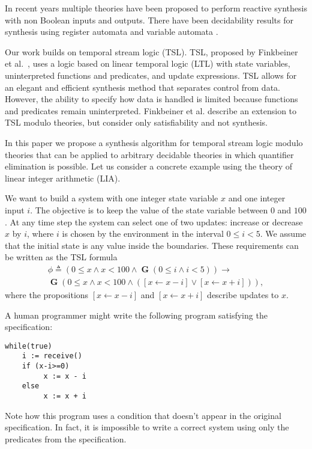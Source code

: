 \documentclass[runningheads]{llncs}
\newcommand{\globally}{\operatorname{\mathbf{G}}}
\newcommand{\rarrow}{\boldsymbol{\rightarrow}}
\begin{document}
In recent years multiple theories have been proposed to perform reactive synthesis with non Boolean inputs and outputs.
There have been decidability results for synthesis using register automata \cite{ehlers2014,khalimov2018,exibard2021} and variable automata \cite{faran2020}.

Our work builds on temporal stream logic (TSL). TSL, proposed by Finkbeiner et al.\ \cite{finkbeiner2019a}, uses a logic based on linear temporal logic (LTL) with state variables, uninterpreted functions and predicates, and update expressions. TSL allows for an elegant and efficient synthesis method that separates control from data.
However, the ability to specify how data is handled is limited because functions and predicates remain uninterpreted.
Finkbeiner et al. \cite{finkbeiner2021} describe an extension to TSL modulo theories, but consider only satisfiability and not synthesis.

In this paper we propose a synthesis algorithm for temporal stream logic modulo theories that can be applied to arbitrary decidable theories in which quantifier elimination is possible.
Let us consider a concrete example using the theory of linear integer arithmetic (LIA).

\begin{example}
We want to build a system with one integer state variable $x$ and one integer input $i$.
The objective is to keep the value of the state variable between $0$ and $100$.
At any time step the system can select one of two updates: increase or decrease $x$ by $i$, where $i$ is chosen by the environment in the interval $0 \leq i < 5$.
We assume that the initial state is any value inside the boundaries.
These requirements can be written as the TSL formula
\begin{multline*}
    \phi \triangleq (0 \leq x \land x < 100 \land \globally (0 \leq i \land i < 5)) \rarrow \\
\globally (0 \leq x \land x < 100 \land ([x \leftarrow x-i] \lor [x \leftarrow x+i])),    
\end{multline*}
where the propositions $[x \leftarrow x-i]$ and $[x \leftarrow x+i]$ describe updates to $x$.

A human programmer might write the following program satisfying the specification:
\begin{lstlisting}
while(true)
    i := receive()
    if (x-i>=0)
         x := x - i
    else
         x := x + i
\end{lstlisting}
Note how this program uses a condition that doesn't appear in the original specification.
In fact, it is impossible to write a correct system using only the predicates from the specification.
\end{example}
\end{document}
